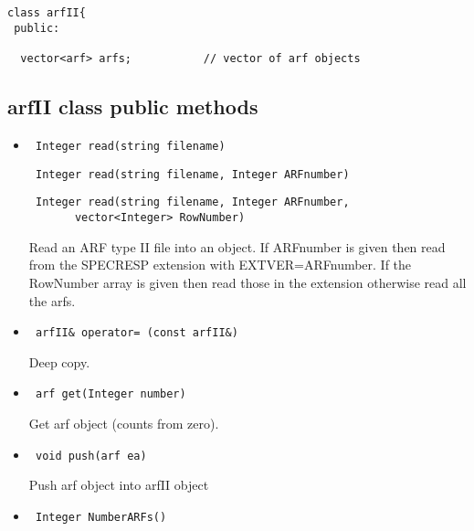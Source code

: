 \documentclass[11pt]{book}
\begin{document}
\begin{verbatim}


class arfII{
 public:

  vector<arf> arfs;           // vector of arf objects

\end{verbatim}

\subsection{arfII class public methods}

\begin{itemize}

\item  \begin{verbatim} Integer read(string filename) \end{verbatim}
       \begin{verbatim} Integer read(string filename, Integer ARFnumber) \end{verbatim}
       \begin{verbatim} Integer read(string filename, Integer ARFnumber, 
       vector<Integer> RowNumber) \end{verbatim}

           Read an ARF type II file into an object. If ARFnumber is
           given then read from the SPECRESP extension with EXTVER=ARFnumber.
           If the RowNumber array is given then read those in the 
           extension otherwise read all the arfs.

\item  \begin{verbatim} arfII& operator= (const arfII&) \end{verbatim}

           Deep copy.

\item  \begin{verbatim} arf get(Integer number) \end{verbatim}

           Get arf object (counts from zero).

\item  \begin{verbatim} void push(arf ea) \end{verbatim}

           Push arf object into arfII object

\item  \begin{verbatim} Integer NumberARFs() \end{verbatim}


\end{itemize}
\end{document}
